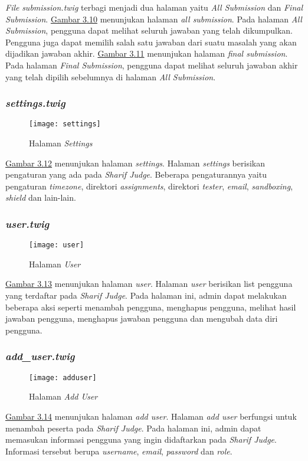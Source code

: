  \textit{File} \textit{submission.twig} terbagi menjadi dua halaman yaitu \textit{All Submission} dan \textit{Final Submission}. \hyperref[fig:allsubmission]{Gambar 3.10} menunjukan halaman \textit{all submission}. Pada halaman \textit{All Submission}, pengguna dapat melihat seluruh jawaban yang telah dikumpulkan. Pengguna juga dapat memilih salah satu jawaban dari suatu masalah yang akan dijadikan jawaban akhir. \hyperref[fig:finalsubmission]{Gambar 3.11} menunjukan halaman \textit{final submission}. Pada halaman \textit{Final Submission}, pengguna dapat melihat seluruh jawaban akhir yang telah dipilih sebelumnya di halaman \textit{All Submission}.

\subsubsection{\textit{settings.twig}}
\begin{figure}[H]
	\centering  
	\texttt{[image: settings]}  
	\caption[Halaman \textit{Settings}]{Halaman \textit{Settings}} 
	\label{fig:settings} 
\end{figure} 
\hyperref[fig:settings]{Gambar 3.12} menunjukan halaman \textit{settings}. Halaman \textit{settings} berisikan pengaturan yang ada pada \textit{Sharif Judge}. Beberapa pengaturannya yaitu pengaturan \textit{timezone}, direktori \textit{assignments}, direktori \textit{tester}, \textit{email}, \textit{sandboxing}, \textit{shield} dan lain-lain.

\subsubsection{\textit{user.twig}}
\begin{figure}[H]
	\centering  
	\texttt{[image: user]}  
	\caption[Halaman \textit{User}]{Halaman \textit{User}} 
	\label{fig:user} 
\end{figure} 
\hyperref[fig:user]{Gambar 3.13} menunjukan halaman \textit{user}. Halaman \textit{user} berisikan list pengguna yang terdaftar pada \textit{Sharif Judge}. Pada halaman ini, admin dapat melakukan beberapa aksi seperti menambah pengguna, menghapus pengguna, melihat hasil jawaban pengguna, menghapus jawaban pengguna dan mengubah data diri pengguna. 

\subsubsection{\textit{add\_user.twig}}
\begin{figure}[H]
	\centering  
	\texttt{[image: adduser]}  
	\caption[Halaman \textit{Add User}]{Halaman \textit{Add User}} 
	\label{fig:adduser} 
\end{figure} 
\hyperref[fig:adduser]{Gambar 3.14} menunjukan halaman \textit{add user}. Halaman \textit{add user} berfungsi untuk menambah peserta pada \textit{Sharif Judge}. Pada halaman ini, admin dapat memasukan informasi pengguna yang ingin didaftarkan pada \textit{Sharif Judge}. Informasi tersebut berupa \textit{username}, \textit{email}, \textit{password} dan \textit{role}.

